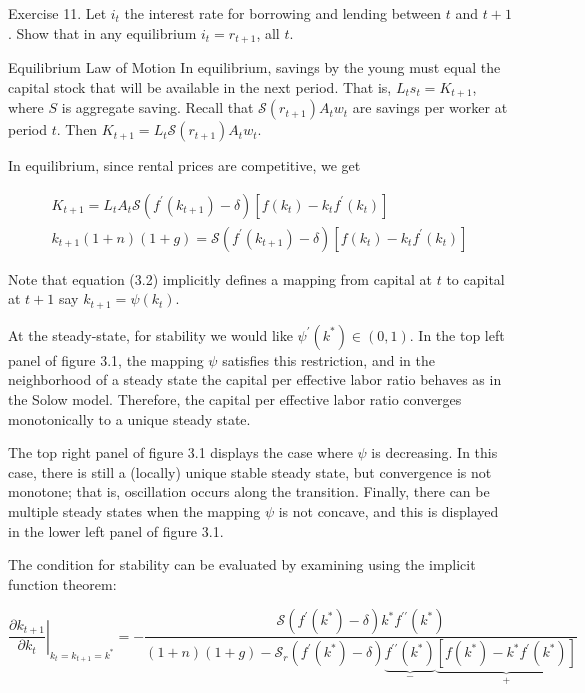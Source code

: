 \documentclass[10pt]{article}
\begin{document}
Exercise 11. Let $i_{t}$ the interest rate for borrowing and lending between $t$ and $t+1$. Show that in any equilibrium $i_{t}=r_{t+1}$, all $t$.

Equilibrium Law of Motion In equilibrium, savings by the young must equal the capital stock that will be available in the next period. That is, $L_{t} s_{t}=K_{t+1}$, where $S$ is aggregate saving. Recall that $\mathcal{S}\left(r_{t+1}\right) A_{t} w_{t}$ are savings per worker at period $t$. Then $K_{t+1}=L_{t} \mathcal{S}\left(r_{t+1}\right) A_{t} w_{t}$.

In equilibrium, since rental prices are competitive, we get

\[
\begin{array}{r}
K_{t+1}=L_{t} A_{t} \mathcal{S}\left(f^{\prime}\left(k_{t+1}\right)-\delta\right)\left[f\left(k_{t}\right)-k_{t} f^{\prime}\left(k_{t}\right)\right] \\
k_{t+1}(1+n)(1+g)=\mathcal{S}\left(f^{\prime}\left(k_{t+1}\right)-\delta\right)\left[f\left(k_{t}\right)-k_{t} f^{\prime}\left(k_{t}\right)\right] \tag{3.2}
\end{array}
\]

Note that equation (3.2) implicitly defines a mapping from capital at $t$ to capital at $t+1$ say $k_{t+1}=\psi\left(k_{t}\right)$.

At the steady-state, for stability we would like $\psi^{\prime}\left(k^{*}\right) \in(0,1)$. In the top left panel of figure 3.1, the mapping $\psi$ satisfies this restriction, and in the neighborhood of a steady state the capital per effective labor ratio behaves as in the Solow model. Therefore, the capital per effective labor ratio converges monotonically to a unique steady state.

The top right panel of figure 3.1 displays the case where $\psi$ is decreasing. In this case, there is still a (locally) unique stable steady state, but convergence is not monotone; that is, oscillation occurs along the transition. Finally, there can be multiple steady states when the mapping $\psi$ is not concave, and this is displayed in the lower left panel of figure 3.1.

The condition for stability can be evaluated by examining using the implicit function theorem:

$$
\left.\frac{\partial k_{t+1}}{\partial k_{t}}\right|_{k_{t}=k_{t+1}=k^{*}}=-\frac{\mathcal{S}\left(f^{\prime}\left(k^{*}\right)-\delta\right) k^{*} f^{\prime \prime}\left(k^{*}\right)}{(1+n)(1+g)-\mathcal{S}_{r}\left(f^{\prime}\left(k^{*}\right)-\delta\right) \underbrace{f^{\prime \prime}\left(k^{*}\right)}_{-} \underbrace{\left[f\left(k^{*}\right)-k^{*} f^{\prime}\left(k^{*}\right)\right]}_{+}}
$$
\end{document}
